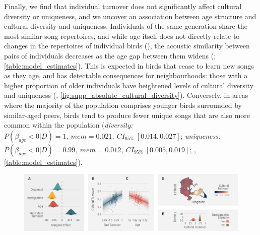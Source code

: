 \documentclass[9pt, onecolumn, twoside, lineno]{gsajnl}
\begin{document}
Finally, we find that individual turnover does not significantly affect cultural diversity or uniqueness, and we uncover an association between age structure and cultural diversity and uniqueness. Individuals of the same generation share the most similar song repertoires, and while age itself does not directly relate to changes in the repertoires of individual birds (), the acoustic similarity between pairs of individuals decreases as the age gap between them widens (; \autoref{table:model_estimates}). This is expected in birds that cease to learn new songs as they age, and has detectable consequences for neighbourhoods: those with a higher proportion of older individuals have heightened levels of cultural diversity and uniqueness (, \autoref{fig:supp_absolute_cultural_diversity}). Conversely, in areas where the majority of the population comprises younger birds surrounded by similar-aged peers, birds tend to produce fewer unique songs that are also more common within the population (\textit{diversity:} $P(\beta_{\overline{age}} < 0 | D) = 1,~mem=0.021,~CI_{95\%}~[0.014, 0.027]$; \textit{uniqueness:} $P(\beta_{\overline{age}} < 0 | D) = 0.99,~mem=0.012,~CI_{95\%}~[0.005, 0.019]$; , \autoref{table:model_estimates}).

\begin{figure}[!htb]
    \centering
    \includegraphics[width=\linewidth]{figures/chapter_4/FIG4.pdf}
    \label{c4_fig:turnover}
\end{figure}
\end{document}
